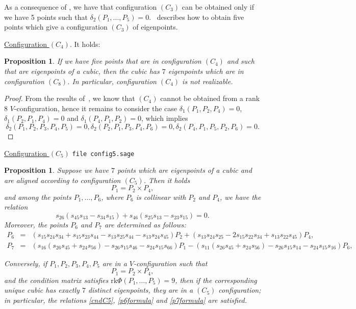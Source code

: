\documentclass{amsart}
\theoremstyle{plain}
\newtheorem{prop}[lemma]{Proposition}
\theoremstyle{definition}
\newcommand{\rk}{\ensuremath{\mathrm{rk}}}
\begin{document}
As a consequence of , we have that configuration $(C_3)$ can
be obtained only if we have 5 points such that
$\delta_2(P_1, \dotsc, P_5) = 0$.~ describes how to
obtain five points which give a configuration $(C_3)$ of eigenpoints.

\underline{Configuration $(C_4)$}. It holds:
\begin{prop}
\label{conf4no} If we have five points that are in
configuration $(C_4)$ and such that are eigenpoints of a cubic, then the
cubic has $7$ eigenpoints which are in configuration $(C_8)$. In particular,
configuration $(C_4)$ is not realizable.
\end{prop}
\begin{proof}
From the results of~, we know that $(C_4)$
cannot be obtained from a rank 8 $V$-configuration,
hence it remains to consider the case $\delta_1(P_1, P_2, P_4) = 0$,
$\delta_1(P_2, P_1, P_4) = 0$ and $\delta_1(P_4, P_1, P_2) = 0$,
which implies
\[
\delta_2(P_1, P_2, P_3, P_4, P_5)=0,
\delta_2(P_2, P_1, P_3, P_4, P_6)=0,
\delta_2(P_4, P_1, P_5, P_2, P_6)=0.
\]
\end{proof}


\underline{Configuration $(C_5)$}
\verb+file config5.sage+
\begin{prop}
Suppose we have $7$ points which are eigenpoints of a cubic and are
aligned according to configuration $(C_5)$. Then 
it holds
\[
P_1 = P_2 \times P_4,
\]
and among the points $P_1, \dots, P_6$, where $P_6$ is collinear with $P_2$ and $P_4$, we have the relation
\begin{equation}
s_{26}(s_{45}s_{13}-s_{34}s_{15})+s_{46}(s_{25}s_{13}-s_{23}s_{15}) = 0.
\label{cndC5}
\end{equation}
Moreover, the points $P_6$ and $P_7$ are determined as follows:
 \begin{eqnarray}
    P_6 & = & (s_{15}s_{24}s_{34}+s_{15}s_{23}s_{44} -s_{13}s_{25}s_{44} -s_{13}s_{24}s_{45})P_2 + (s_{13}s_{24}s_{25}-2s_{15}s_{22}s_{34}+s_{13}s_{22}s_{45})P_4 ,\label{p6formula}\\
P_7 & = & (s_{16}(s_{26}s_{45}+s_{24}s_{56})-s_{26}s_{15}s_{46}-s_{24}s_{15}s_{66})P_1-
(s_{11}(s_{26}s_{45}+s_{24}s_{56})-s_{26}s_{15}s_{14}-s_{24}s_{15}s_{16})P_6 ,
\label{p7formula}
\end{eqnarray}



Conversely, if $P_1, P_2, P_3, P_4, P_5$ are in a $V$-configuration such that 
\[
P_1=P_2 \times P_4,
\]
and the condition matrix satisfies
$\rk \Phi (P_1, \dots, P_5) =9$, then if the corresponding unique cubic has exactly $7$ distinct eigenpoints, they are in a $(C_5)$ configuration; in particular, the relations \eqref{cndC5}, \eqref{p6formula} and \eqref{p7formula} are satisfied.

\end{prop}
\end{document}
